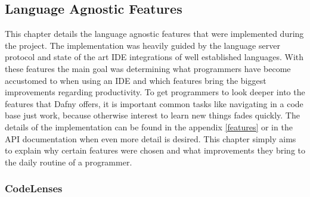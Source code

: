 \subsection{Language Agnostic Features}\label{agfeatures}
This chapter details the language agnostic features that were implemented during the project. The implementation was heavily guided by the language server protocol and state of the art IDE integrations of well established languages. With these features the main goal was determining what programmers have become accustomed to when using an IDE and which features bring the biggest improvements regarding productivity. To get programmers to look deeper into the features that Dafny offers, it is important common tasks like navigating in a code base just work, because otherwise interest to learn new things fades quickly. \newline
The details of the implementation can be found in the appendix \ref{features} or in the API documentation when even more detail is desired. This chapter simply aims to explain why certain features were chosen and what improvements they bring to the daily routine of a programmer.
\subsubsection{CodeLenses} \label{agcodelenses}
